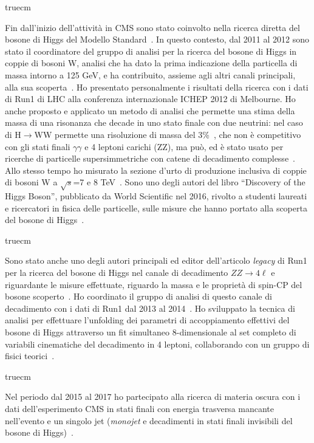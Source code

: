 \documentclass[11pt,twoside,a4paper]{article}
\begin{document}
 truecm

Fin dall'inizio dell'attivit\`a in CMS sono stato coinvolto nella
ricerca diretta del bosone di Higgs del Modello
Standard~\cite{Chatrchyan:2011tz,Chatrchyan:2012tx,Chatrchyan:2012ty}. In
questo contesto, dal 2011 al 2012 sono stato il coordinatore del
gruppo di analisi per la ricerca del bosone di Higgs in coppie di
bosoni W, analisi che ha dato la prima indicazione della particella di
massa intorno a 125 GeV, e ha contribuito, assieme agli altri canali
principali, alla sua
scoperta~\cite{Chatrchyan:2012ufa,Chatrchyan:2013lba,Chatrchyan:2014vua}. Ho
presentato personalmente i risultati della ricerca con i dati di Run1
di LHC alla conferenza internazionale ICHEP 2012 di Melbourne. Ho
anche proposto e applicato un metodo di analisi che permette una stima
della massa di una risonanza che decade in uno stato finale con due
neutrini: nel caso di H$\to$WW permette una risoluzione di massa del
3\%~\cite{Chatrchyan:2013iaa}, che non \`e competitivo con gli stati
finali $\gamma\gamma$ e 4 leptoni carichi (ZZ), ma pu\`o, ed \`e stato
usato per ricerche di particelle supersimmetriche con catene di
decadimento complesse~\cite{Khachatryan:2016epu}. Allo stesso tempo ho
misurato la sezione d'urto di produzione inclusiva di coppie di bosoni
W a $\sqrt{s}$=7 e 8 TeV~\cite{Chatrchyan:2013yaa}. Sono uno degli
autori del libro ``Discovery of the Higgs Boson'', pubblicato da World
Scientific nel 2016, rivolto a studenti laureati e ricercatori in
fisica delle particelle, sulle misure che hanno portato alla scoperta
del bosone di Higgs~\cite{Nisati:2017cst}.

 truecm

Sono stato anche uno degli autori principali ed editor dell'articolo
\textit{legacy} di Run1 per la ricerca del bosone di Higgs nel canale
di decadimento $ZZ\to4\ell$ e riguardante le misure effettuate,
riguardo la massa e le propriet\`a di spin-CP del bosone
scoperto~\cite{Chatrchyan:2013mxa}. Ho coordinato il gruppo di analisi
di questo canale di decadimento con i dati di Run1 dal 2013 al
2014~\cite{Khachatryan:2014kca}. Ho sviluppato la tecnica di analisi
per effettuare l'unfolding dei parametri di accoppiamento effettivi
del bosone di Higgs attraverso un fit simultaneo 8-dimensionale al set
completo di variabili cinematiche del decadimento in 4 leptoni,
collaborando con un gruppo di fisici teorici~\cite{Chen:2014pia}.

 truecm

Nel periodo dal 2015 al 2017 ho partecipato alla ricerca di materia
oscura con i dati dell'esperimento CMS in stati finali con energia
trasversa mancante nell'evento e un singolo jet (\textit{monojet} e
decadimenti in stati finali invisibili del bosone di
Higgs)~\cite{Sirunyan:2017hci,Sirunyan:2017jix}.
\end{document}
